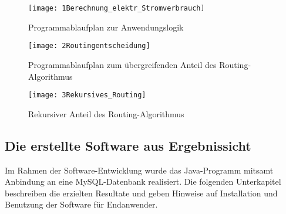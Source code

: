 \begin{figure}[htbp]
	\centering
	\texttt{[image: 1Berechnung\_elektr\_Stromverbrauch]}
	\caption{Programmablaufplan zur Anwendungslogik}
	\label{fig:1Berechnung_elektr_Stromverbrauch}
\end{figure}

\begin{figure}[htbp]
	\centering
	\texttt{[image: 2Routingentscheidung]}
	\caption{Programmablaufplan zum übergreifenden Anteil des Routing-Algorithmus}
	\label{fig:2Routingentscheidung}
\end{figure}

\begin{figure}[htbp]
	\centering
	\texttt{[image: 3Rekursives\_Routing]}
	\caption{Rekursiver Anteil des Routing-Algorithmus}
	\label{fig:3Rekursives_Routing}
\end{figure}

\newpage
\subsection{Die erstellte Software aus Ergebnissicht}\label{subsec:ErgSoftware}
Im Rahmen der Software-Entwicklung wurde das Java-Programm  mitsamt Anbindung an eine MySQL-Datenbank realisiert. Die folgenden Unterkapitel beschreiben die erzielten Resultate und geben Hinweise auf Installation und Benutzung der Software für Endanwender.

